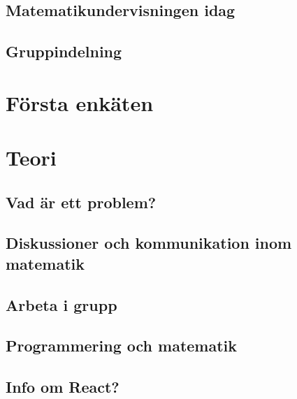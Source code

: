\documentclass[11 pt,a4paper]{article}
\begin{document}
    \subsection{Matematikundervisningen idag}
        
        
    \subsection{Gruppindelning}
        \label{sec:Gruppindelning}
        
        
\section{Första enkäten}
    
    
\section{Teori}
    \label{sec:Teori}
    
    
    \subsection{Vad är ett problem?}
        
        
    \subsection{Diskussioner och kommunikation inom matematik}
        
        
    \subsection{Arbeta i grupp}
        
        
    \subsection{Programmering och matematik}
        
        
    \subsection{Info om React?}
        
\end{document}
